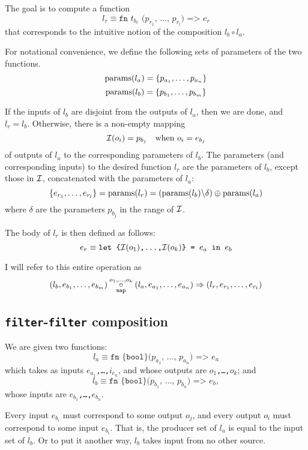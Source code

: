 The goal is to compute a function
\[
l_{r} \equiv \texttt{fn $t_{b_{r}}$ ($p_{r_{1}}$, \ldots, $p_{r_{l}}$)
=> $e_{r}$}
\]
that corresponds to the intuitive notion of the composition $l_{b}
\circ l_{a}$.

For notational convenience, we define the following sets of parameters
of the two functions.
\[
\textrm{params}(l_{a}) = \{p_{a_{1}}, \ldots, p_{a_{n}}\}
\]
\[
\textrm{params}(l_{b}) = \{p_{b_{1}}, \ldots, p_{b_{m}}\}
\]

If the inputs of $l_{b}$ are disjoint from the outputs of $l_{a}$,
then we are done, and $l_{r} = l_{b}$.  Otherwise, there is a
non-empty mapping
\[
\mathcal{I}(o_{i}) = p_{b_{j}} \quad \textrm{when $o_{i} = e_{b_{j}}$}
\]
of outputs of $l_{a}$ to the corresponding parameters of $l_{b}$.  The
parameters (and corresponding inputs) to the desired function $l_{r}$
are the parameters of $l_{b}$, except those in $\mathcal{I}$,
concatenated with the parameters of $l_{a}$:
\[
\{e_{r_{1}},\ldots,e_{r_{l}}\} = \textrm{params}(l_{r}) = (\textrm{params}(l_{b}) \backslash \delta) \oplus \textrm{params}(l_{a})
\]
where $\delta$ are the parameters $p_{b_{j}}$ in the range of
$\mathcal{I}$.

The body of $l_{r}$ is then defined as follows:
\[
e_{r} \equiv \texttt{let \{$\mathcal{I}(o_{1})$,\ldots,$\mathcal{I}(o_{k})$\} = $e_{a}$ in $e_{b}$}
\]

I will refer to this entire operation as
\[
(l_{b},e_{b_{1}},\ldots,e_{b_{m}}) \underset{\texttt{map}}{\overset{o_1,\ldots,o_k}\circ}(l_{a},e_{a_{1}},\ldots,e_{a_{n}}) \Rightarrow (l_{r},e_{r_{1}},\ldots,e_{r_{l}})
\]

\subsection{\texttt{filter}-\texttt{filter} composition}

We are given two functions:
\[
l_{a}\equiv\texttt{fn \{bool\} ($p_{a_{1}}$, \ldots, $p_{a_{n}}$) => $e_{a}$}
\]
which takes as inputs \texttt{$e_{a_{1}}$,\ldots,$i_{e_{n}}$}, and whose
outputs are \texttt{$o_1$,\ldots,$o_k$}; and
\[
l_{b}\equiv\texttt{fn \{bool\} ($p_{b_{1}}$, \ldots, $p_{b_{n}}$) => $e_{b}$},
\]
whose inputs are \texttt{$e_{b_{1}}$,\ldots,$e_{b_{n}}$}.

Every input $e_{b_{i}}$ must correspond to some output $o_{j}$, and
every output $o_{i}$ must correspond to some input $e_{b_{i}}$.  That
is, the producer set of $l_{a}$ is equal to the input set of $l_{b}$.
Or to put it another way, $l_{b}$ takes input from no other source.

